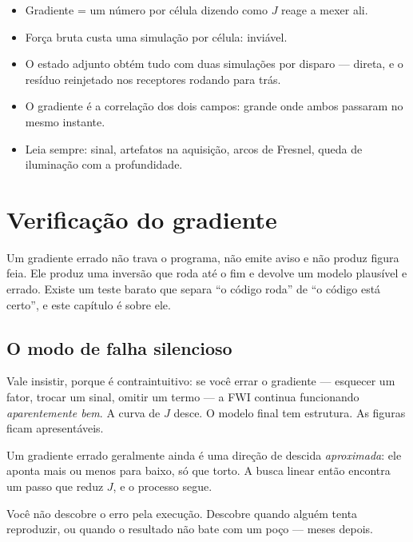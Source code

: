 \documentclass[11pt,a4paper,oneside]{report}
\begin{document}
\begin{resumo}
\begin{itemize}[leftmargin=*, itemsep=1pt]
\item Gradiente = um n\'umero por c\'elula dizendo como $J$ reage a mexer
ali.
\item For\c{c}a bruta custa uma simula\c{c}\~ao por c\'elula: invi\'avel.
\item O estado adjunto obt\'em tudo com duas simula\c{c}\~oes por disparo ---
direta, e o res\'iduo reinjetado nos receptores rodando para tr\'as.
\item O gradiente \'e a correla\c{c}\~ao dos dois campos: grande onde ambos
passaram no mesmo instante.
\item Leia sempre: sinal, artefatos na aquisi\c{c}\~ao, arcos de Fresnel,
queda de ilumina\c{c}\~ao com a profundidade.
\end{itemize}
\end{resumo}

\chapter{Verifica\c{c}\~ao do gradiente}
\label{cap:verificacao}

\begin{ideia}
Um gradiente errado n\~ao trava o programa, n\~ao emite aviso e n\~ao produz
figura feia. Ele produz uma invers\~ao que roda at\'e o fim e devolve um
modelo plaus\'ivel e errado. Existe um teste barato que separa ``o c\'odigo
roda'' de ``o c\'odigo est\'a certo'', e este cap\'itulo \'e sobre ele.
\end{ideia}

\section{O modo de falha silencioso}

Vale insistir, porque \'e contraintuitivo: se voc\^e errar o gradiente ---
esquecer um fator, trocar um sinal, omitir um termo --- a FWI continua
funcionando \emph{aparentemente bem}. A curva de $J$ desce. O modelo final
tem estrutura. As figuras ficam apresent\'aveis.

\begin{armadilha}
Um gradiente errado geralmente ainda \'e uma dire\c{c}\~ao de descida
\emph{aproximada}: ele aponta mais ou menos para baixo, s\'o que torto. A
busca linear ent\~ao encontra um passo que reduz $J$, e o processo segue.

Voc\^e n\~ao descobre o erro pela execu\c{c}\~ao. Descobre quando algu\'em
tenta reproduzir, ou quando o resultado n\~ao bate com um po\c{c}o --- meses
depois.
\end{armadilha}
\end{document}
